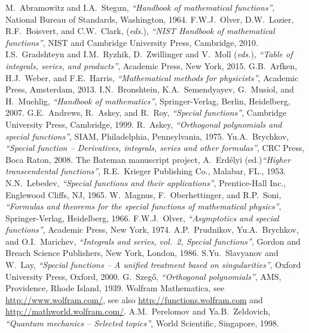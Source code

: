 \documentclass[a4paper,12pt,final]{article}
\begin{document}
\begin{thebibliography}{99}
\def\refttl#1{{\it ``#1''}, }
 M.~Abramowitz and I.A.~Stegun, {\it ``Handbook of mathematical functions''}, National Bureau of Standards, Washington, 1964.
 F.W.J.~Olver, D.W.~Lozier, R.F.~Boisvert, and C.W.~Clark, ({\it eds.}), {\it ``NIST Handbook of mathematical functions''}, NIST and Cambridge University Press, Cambridge, 2010.
 I.S.~Gradshteyn and I.M.~Ryzhik, D.~Zwillinger and V.~Moll ({\it eds.}), {\it ``Table of integrals, series, and products''}, Academic Press, New York, 2015.
 G.B.~Arfken, H.J.~Weber, and F.E.~Harris, {\it ``Mathematical methods for physicists''}, Academic Press, Amsterdam, 2013.
 I.N.~Bronshtein, K.A.~Semendyayev, G.~Musiol, and H.~Muehlig, {\it ``Handbook of mathematics''}, Springer-Verlag, Berlin, Heidelberg, 2007.
 G.E.~Andrews, R.~Askey, and R.~Roy, {\it ``Special functions''}, Cambridge University Press, Cambridge, 1999.
 R.~Askey, {\it ``Orthogonal polynomials and special functions''}, SIAM, Philadelphia, Pennsylvania, 1975.
 Yu.A.~Brychkov, {\it ``Special function -- Derivatives, integrals, series and other formulas''}, CRC Press, Boca Raton, 2008.
 The Bateman manuscript project, A.~Erdélyi (ed.){\it ``Higher transcendental functions''}, R.E.~Krieger Publishing Co., Malabar, FL., 1953.
 N.N.~Lebedev, {\it ``Special functions and their applications''}, Prentice-Hall Inc., Englewood Cliffs, NJ, 1965.
 W.~Magnus, F.~Oberhettinger, and R.P.~Soni, {\it ``Formulas and theorems for the special functions of mathematical physics''}, Springer-Verlag, Heidelberg, 1966.
 F.W.J.~Olver, {\it ``Asymptotics and special functions''}, Academic Press, New York, 1974.
 A.P.~Prudnikov, Yu.A.~Brychkov, and O.I.~Marichev, {\it ``Integrals and series, vol.\ 2, Special functions''}, Gordon and Breach Science Publishers, New York, London, 1986.
 S.Yu.~Slavyanov and W.~Lay, {\it ``Special functions -- A unified treatment based on singularities''}, Oxford University Press, Oxford, 2000.
 G.~Szegő, {\it ``Orthogonal polynomials''}, AMS, Providence, Rhode Island, 1939.
 Wolfram Mathematica, see \url{http://www.wolfram.com/}, see also \url{http://functions.wolfram.com} and \url{http://mathworld.wolfram.com/}.
 A.M.~Perelomov and Ya.B.~Zeldovich, {\it ``Quantum mechanics -- Selected topics''}, World Scientific, Singapore, 1998.

\end{thebibliography}
\end{document}
